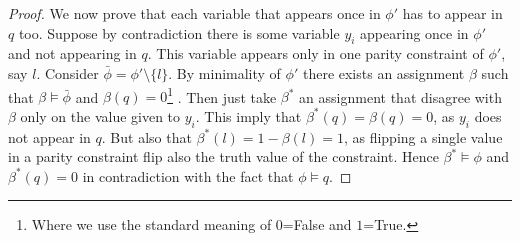 \documentclass[a4paper,twoside,justified]{tufte-handout}
\begin{document}
\begin{proof}
We now prove that each variable that appears once in $\phi'$ has to appear in $q$ too. 
Suppose by contradiction there is some variable $y_i$ appearing once in $\phi'$ and not appearing in $q$. 
This variable appears only in one parity constraint of $\phi'$, say $l$. Consider $\bar \phi=\phi'\setminus \{l\}$. 
By minimality of $\phi'$ there exists an assignment $\beta$ such that $\beta \models \bar \phi$ and $\beta(q)=0$\footnote{
Where we use the standard meaning of $0$=False and $1$=True.
}
. 
Then just take $\beta^*$ an assignment that disagree with $\beta$ only on the value given to $y_i$. 
This imply that $\beta^*(q)=\beta(q)=0$, as $y_i$ does not appear in $q$.
 But also that $\beta^*(l)=1-\beta(l)=1$, as flipping a single value in a parity constraint flip also the truth value of the constraint. 
 Hence $\beta^*\models \phi$ and $\beta^*(q)=0$ in contradiction with the fact that $\phi\models q$.
\end{proof}



\end{document}

